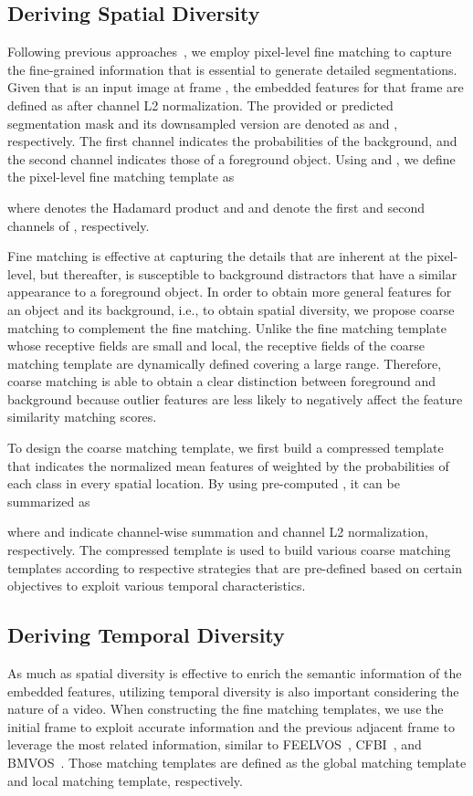 \documentclass[runningheads]{llncs}
\begin{document}
\subsection{Deriving Spatial Diversity}
Following previous approaches~\cite{VideoMatch, FEELVOS, RANet, CFBI, BMVOS}, we employ pixel-level fine matching to capture the fine-grained information that is essential to generate detailed segmentations. Given that  is an input image at frame , the embedded features for that frame are defined as  after channel L2 normalization. The provided or predicted segmentation mask and its downsampled version are denoted as  and , respectively. The first channel indicates the probabilities of the background, and the second channel indicates those of a foreground object. Using  and , we define the pixel-level fine matching template  as

where  denotes the Hadamard product and  and  denote the first and second channels of , respectively. 



Fine matching is effective at capturing the details that are inherent at the pixel-level, but thereafter, is susceptible to background distractors that have a similar appearance to a foreground object. In order to obtain more general features for an object and its background, i.e., to obtain spatial diversity, we propose coarse matching to complement the fine matching. Unlike the fine matching template whose receptive fields are small and local, the receptive fields of the coarse matching template are dynamically defined covering a large range. Therefore, coarse matching is able to obtain a clear distinction between foreground and background because outlier features are less likely to negatively affect the feature similarity matching scores.


To design the coarse matching template, we first build a compressed template  that indicates the normalized mean features of  weighted by the probabilities of each class in every spatial location. By using pre-computed , it can be summarized as

where  and  indicate channel-wise summation and channel L2 normalization, respectively. The compressed template is used to build various coarse matching templates according to respective strategies that are pre-defined based on certain objectives to exploit various temporal characteristics.


\subsection{Deriving Temporal Diversity}
As much as spatial diversity is effective to enrich the semantic information of the embedded features, utilizing temporal diversity is also important considering the nature of a video. When constructing the fine matching templates, we use the initial frame to exploit accurate information and the previous adjacent frame to leverage the most related information, similar to FEELVOS~\cite{FEELVOS}, CFBI~\cite{CFBI}, and BMVOS~\cite{BMVOS}. Those matching templates are defined as the global matching template and local matching template, respectively. 
\end{document}
